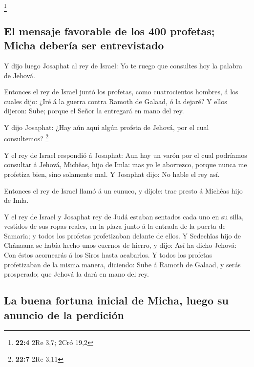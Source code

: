 \footnote{\textbf{22:4} 2Re 3,7; 2Cró 19,2}

\hypertarget{el-mensaje-favorable-de-los-400-profetas-micha-deberuxeda-ser-entrevistado}{%
\subsection{El mensaje favorable de los 400 profetas; Micha debería ser
entrevistado}\label{el-mensaje-favorable-de-los-400-profetas-micha-deberuxeda-ser-entrevistado}}

 Y dijo luego Josaphat al rey de Israel: Yo te ruego que
consultes hoy la palabra de Jehová.

 Entonces el rey de Israel juntó los profetas, como
cuatrocientos hombres, á los cuales dijo: ¿Iré á la guerra contra Ramoth
de Galaad, ó la dejaré? Y ellos dijeron: Sube; porque el Señor la
entregará en mano del rey.

 Y dijo Josaphat: ¿Hay aún aquí algún profeta de Jehová, por
el cual consultemos? \footnote{\textbf{22:7} 2Re 3,11}

 Y el rey de Israel respondió á Josaphat: Aun hay un varón
por el cual podríamos consultar á Jehová, Michêas, hijo de Imla: mas yo
le aborrezco, porque nunca me profetiza bien, sino solamente mal. Y
Josaphat dijo: No hable el rey así.

 Entonces el rey de Israel llamó á un eunuco, y díjole: trae
presto á Michêas hijo de Imla.

 Y el rey de Israel y Josaphat rey de Judá estaban sentados
cada uno en su silla, vestidos de sus ropas reales, en la plaza junto á
la entrada de la puerta de Samaria; y todos los profetas profetizaban
delante de ellos.  Y Sedechîas hijo de Chânaana se había
hecho unos cuernos de hierro, y dijo: Así ha dicho Jehová: Con éstos
acornearás á los Siros hasta acabarlos.  Y todos los
profetas profetizaban de la misma manera, diciendo: Sube á Ramoth de
Galaad, y serás prosperado; que Jehová la dará en mano del rey.

\hypertarget{la-buena-fortuna-inicial-de-micha-luego-su-anuncio-de-la-perdiciuxf3n}{%
\subsection{La buena fortuna inicial de Micha, luego su anuncio de la
perdición}\label{la-buena-fortuna-inicial-de-micha-luego-su-anuncio-de-la-perdiciuxf3n}}

